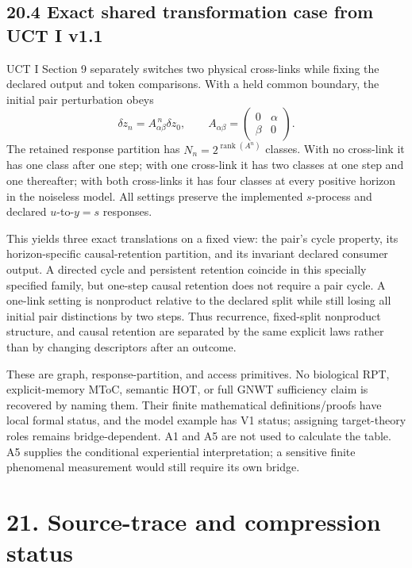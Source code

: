 \documentclass[
  11pt,
  a4paper,
]{article}
\begin{document}
\hypertarget{exact-shared-transformation-case-from-uct-i-v1.1}{%
\subsection{20.4 Exact shared transformation case from UCT I
v1.1}\label{exact-shared-transformation-case-from-uct-i-v1.1}}

UCT I Section 9 separately switches two physical cross-links while
fixing the declared output and token comparisons. With a held common
boundary, the initial pair perturbation obeys \[
\delta z_n=A_{\alpha\beta}^{\,n}\delta z_0,\qquad
A_{\alpha\beta}=\begin{pmatrix}0&\alpha\\\beta&0\end{pmatrix}.
\] The retained response partition has
\(N_n=2^{\operatorname{rank}(A^n)}\) classes. With no cross-link it has
one class after one step; with one cross-link it has two classes at one
step and one thereafter; with both cross-links it has four classes at
every positive horizon in the noiseless model. All settings preserve the
implemented \(s\)-process and declared \(u\)-to-\(y=s\) responses.

This yields three exact translations on a fixed view: the pair's cycle
property, its horizon-specific causal-retention partition, and its
invariant declared consumer output. A directed cycle and persistent
retention coincide in this specially specified family, but one-step
causal retention does not require a pair cycle. A one-link setting is
nonproduct relative to the declared split while still losing all initial
pair distinctions by two steps. Thus recurrence, fixed-split nonproduct
structure, and causal retention are separated by the same explicit laws
rather than by changing descriptors after an outcome.

These are graph, response-partition, and access primitives. No
biological RPT, explicit-memory MToC, semantic HOT, or full GNWT
sufficiency claim is recovered by naming them. Their finite mathematical
definitions/proofs have local formal status, and the model example has
V1 status; assigning target-theory roles remains bridge-dependent. A1
and A5 are not used to calculate the table. A5 supplies the conditional
experiential interpretation; a sensitive finite phenomenal measurement
would still require its own bridge.

\hypertarget{source-trace-and-compression-status}{%
\section{21. Source-trace and compression
status}\label{source-trace-and-compression-status}}
\end{document}
